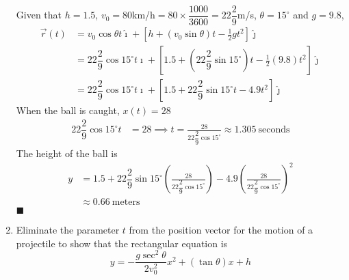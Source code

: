\begin{enumerate}
          \sol{}  Given that $h = 1.5$, $v_0 = 80$km/h$=80\times\dfrac{1000}{3600}=22\dfrac{2}{9}$m/s, $\theta = 15^{\circ}$ and $g = 9.8$,
          \begin{align*}
              \vec{r}(t) & = v_0\cos\theta t\hat{\imath} + \left[h + (v_0\sin\theta) t - \frac{1}{2}gt^2\right]\hat{\jmath}                                         \\
                         & = 22\dfrac{2}{9}\cos{15^{\circ}} t\hat{\imath} + \left[1.5 + (22\dfrac{2}{9}\sin{15^{\circ}}) t - \frac{1}{2}(9.8)t^2\right]\hat{\jmath} \\
                         & = 22\dfrac{2}{9}\cos{15^{\circ}} t\hat{\imath} + \left[1.5 + 22\dfrac{2}{9}\sin{15^{\circ}} t - 4.9t^2\right]\hat{\jmath}
          \end{align*}
          When the ball is caught, $x(t) = 28$
          \begin{align*}
              22\dfrac{2}{9}\cos{15^{\circ}} t & = 28 \implies t = \frac{28}{22\dfrac{2}{9}\cos{15^{\circ}}} \approx 1.305\ \text{seconds}
          \end{align*}
          The height of the ball is
          \begin{align*}
              y & = 1.5 + 22\dfrac{2}{9}\sin{15^{\circ}} \left(\frac{28}{22\dfrac{2}{9}\cos{15^{\circ}}}\right) - 4.9\left(\frac{28}{22\dfrac{2}{9}\cos{15^{\circ}}}\right)^2 \\
                & \approx 0.66\ \text{meters}
          \end{align*} \hfill$\blacksquare$

          \newpage
    \item Eliminate the parameter $t$ from the position vector for the motion of a
          projectile to show that the rectangular equation is $$ y=-\frac{g \sec ^2
                  \theta}{2 v_0^2} x^2+(\tan \theta) x+h $$


\end{enumerate}
